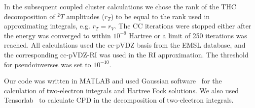 In the subsequent coupled cluster calculations we chose the rank of the THC 
decomposition of ${}^2T$ amplitudes ($r_{T}$) to be equal to the rank 
used in approximating integrals, e.g. $r_{T} = r_{V}$. 
The CC iterations were stopped either after the energy was converged to within 
$10^{-9}$ Hartree or a limit of 250 iterations 
was reached. All calculations used the cc-pVDZ basis from the EMSL
database,\cite{schuchardt2007basis} and the corresponding cc-pVDZ-RI
was used in the RI approximation. The threshold for pseudoinverses was set to 
$10^{-10}$.

Our code was written in MATLAB and used Gaussian software~\cite{gaussian} 
for the calculation of two-electron integrals and Hartree Fock solutions. We 
also used Tensorlab~\cite{vervliettensorlab} to calculate CPD in the 
decomposition of two-electron integrals.

